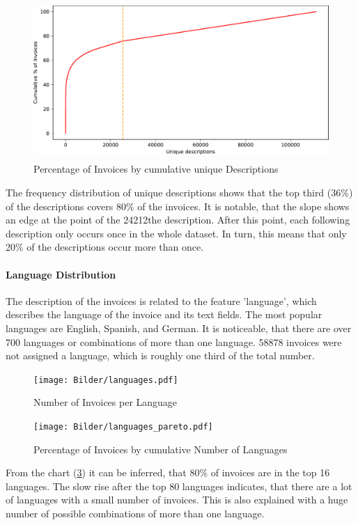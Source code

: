 \begin{figure}[!h]
	\centering
	\includegraphics[height=6cm]{Bilder/data_understanding/descriptions_pareto.pdf}
	\caption{Percentage of Invoices by cumulative unique Descriptions}
	\label{fig:descr-hist}
\end{figure}
The frequency distribution of unique descriptions shows that the top third (36\%) of the descriptions covers 80\% of the invoices. It is notable, that the slope shows an edge at the point of the 24212the description. After this point, each following description only occurs once in the whole dataset. In turn, this means that only 20\% of the descriptions occur more than once.
\paragraph{Language Distribution}
The description of the invoices is related to the feature 'language', which describes the language of the invoice and its text fields. The most popular languages are English, Spanish, and German. It is noticeable, that there are over 700 languages or combinations of more than one language. 58878 invoices were not assigned a language, which is roughly one third of the total number.
\begin{figure}[h!]
	\centering
	\texttt{[image: Bilder/languages.pdf]}
	\caption{Number of Invoices per Language}
	\label{fig:languages-bar}
\end{figure}

\begin{figure}[h!]
	\centering
	\texttt{[image: Bilder/languages\_pareto.pdf]}
	\caption{Percentage of Invoices by cumulative Number of Languages}
	\label{fig:languages-pareto}
\end{figure}


From the chart (\ref{fig:languages-pareto}) it can be inferred, that 80\% of invoices are in the top 16 languages. The slow rise after the top 80 languages indicates, that there are a lot of languages with a small number of invoices. This is also explained with a huge number of possible combinations of more than one language.


